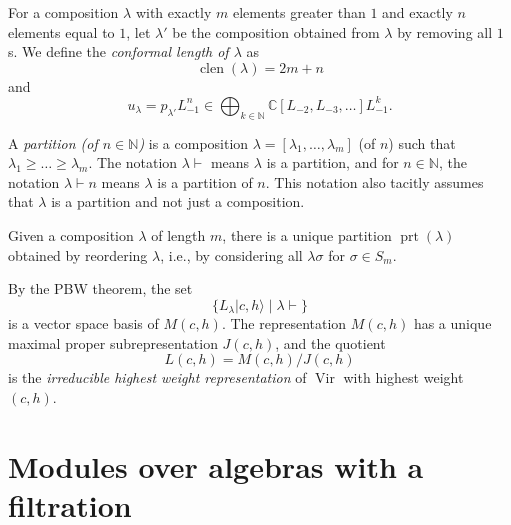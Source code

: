 \documentclass[a4paper, 12pt, reqno]{amsart}
\theoremstyle{remark}
\DeclareMathOperator{\Vir}{Vir}
\DeclareMathOperator{\clen}{clen}
\DeclareMathOperator{\prt}{prt}
\begin{document}
For a composition $\lambda$ with exactly $m$ elements greater than $1$ and exactly $n$ elements equal to $1$, let $\lambda'$ be the composition obtained from $\lambda$ by removing all $1$s.
We define the \emph{conformal length of $\lambda$} as
\begin{equation*}
  \clen(\lambda) = 2m + n
\end{equation*}
and
\begin{equation*}
  u_{\lambda} = p_{\lambda'}L_{-1}^n \in \bigoplus_{k \in \mathbb{N}}\mathbb{C}[L_{-2}, L_{-3}, \dots]L_{-1}^k.
\end{equation*}

A \emph{partition (of $n \in \mathbb{N}$)} is a composition $\lambda = [\lambda_1, \dots, \lambda_m]$ (of $n$) such that $\lambda_1 \ge \dots \ge \lambda_m$.
The notation $\lambda \vdash$ means $\lambda$ is a partition, and for $n \in \mathbb{N}$, the notation $\lambda \vdash n$ means $\lambda$ is a partition of $n$.
This notation also tacitly assumes that $\lambda$ is a partition and not just a composition.

Given a composition $\lambda$ of length $m$, there is a unique partition $\prt(\lambda)$ obtained by reordering $\lambda$, i.e., by considering all $\lambda\sigma$ for $\sigma \in S_m$.

By the PBW theorem, the set
\begin{equation*}
  \{L_{\lambda}|c, h\rangle \mid \lambda \vdash\}
\end{equation*}
is a vector space basis of $M(c, h)$.
The representation $M(c, h)$ has a unique maximal proper subrepresentation $J(c, h)$, and the quotient
\begin{equation*}
  L(c, h) = M(c, h)/J(c, h)
\end{equation*}
is the \emph{irreducible highest weight representation} of $\Vir$ with highest weight $(c, h)$.

\section{Modules over algebras with a filtration}
\label{sec:modul-over-algebr}
\end{document}

